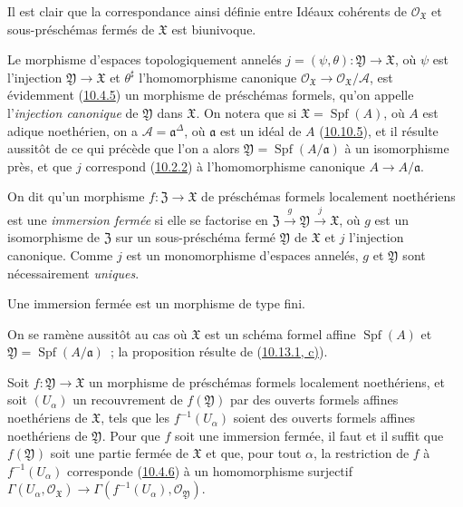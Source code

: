 Il est clair que la correspondance ainsi définie entre
Idéaux cohérents de $\mathscr{O}_{\mathfrak{X}}$ et sous-préschémas fermés de
$\mathfrak{X}$ est biunivoque.

Le morphisme d'espaces topologiquement annelés
$j=(\psi,\theta):\mathfrak{Y}\to\mathfrak{X}$, où $\psi$ est l'injection
$\mathfrak{Y}\to\mathfrak{X}$ et $\theta^\sharp$ l'homomorphisme canonique
$\mathscr{O}_{\mathfrak{X}}\to\mathscr{O}_{\mathfrak{X}}/\mathscr{A}$, est
évidemment (\hyperref[I.10.4.5-fr]{10.4.5}) un morphisme de préschémas formels,
qu'on appelle l'\emph{injection canonique} de $\mathfrak{Y}$ dans $\mathfrak{X}$.
On notera que si $\mathfrak{X}=\operatorname{Spf}(A)$, où $A$ est adique
noethérien, on a $\mathscr{A}=\mathfrak{a}^\Delta$, où $\mathfrak{a}$ est un
idéal de $A$ (\hyperref[I.10.10.5-fr]{10.10.5}), et il résulte aussitôt de ce
qui précède que l'on a alors
$\mathfrak{Y}=\operatorname{Spf}(A/\mathfrak{a})$ à un isomorphisme près, et que
$j$ correspond (\hyperref[I.10.2.2-fr]{10.2.2}) à l'homomorphisme canonique
$A\to A/\mathfrak{a}$.

On dit qu'un morphisme $f:\mathfrak{Z}\to\mathfrak{X}$ de préschémas formels
localement noethériens est une \emph{immersion fermée} si elle se factorise en
$\mathfrak{Z}\xrightarrow{g}\mathfrak{Y}\xrightarrow{j}\mathfrak{X}$, où $g$
est un isomorphisme de $\mathfrak{Z}$ sur un sous-préschéma fermé
$\mathfrak{Y}$ de $\mathfrak{X}$ et $j$ l'injection canonique. Comme $j$ est un
monomorphisme d'espaces annelés, $g$ et $\mathfrak{Y}$ sont nécessairement
\emph{uniques}.

\begin{proposition}[10.14.3]
\label{I.10.14.3-fr}
Une immersion fermée est un morphisme de type fini.
\end{proposition}

On se ramène aussitôt au cas où $\mathfrak{X}$ est un schéma formel affine
$\operatorname{Spf}(A)$ et $\mathfrak{Y}=\operatorname{Spf}(A/\mathfrak{a})$~;
la proposition résulte de (\hyperref[I.10.13.1-fr]{10.13.1, c)}).

\begin{lemma}[10.14.4]
\label{I.10.14.4-fr}
Soit $f:\mathfrak{Y}\to\mathfrak{X}$ un morphisme de préschémas formels
localement noethériens, et soit $(U_\alpha)$ un recouvrement de
$f(\mathfrak{Y})$ par des ouverts formels affines noethériens de
$\mathfrak{X}$, tels que les $f^{-1}(U_\alpha)$ soient des ouverts formels
affines noethériens de $\mathfrak{Y}$. Pour que $f$ soit une immersion fermée,
il faut et il suffit que $f(\mathfrak{Y})$ soit une partie fermée de
$\mathfrak{X}$ et que, pour tout $\alpha$, la restriction de $f$ à
$f^{-1}(U_\alpha)$ corresponde (\hyperref[I.10.4.6-fr]{10.4.6}) à un
homomorphisme surjectif
$\Gamma(U_\alpha,\mathscr{O}_{\mathfrak{X}})\to
\Gamma(f^{-1}(U_\alpha),\mathscr{O}_{\mathfrak{Y}})$.
\end{lemma}

